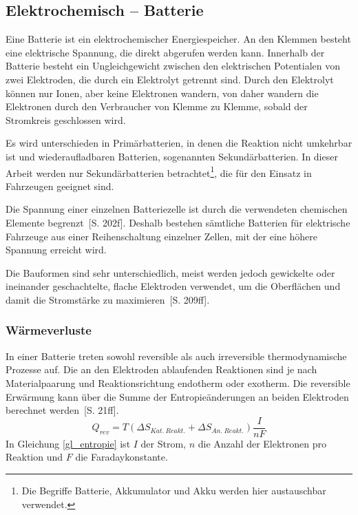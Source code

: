 \subsection{Elektrochemisch – Batterie} %
Eine Batterie ist ein elektrochemischer Energiespeicher. An den Klemmen besteht eine elektrische Spannung, die direkt abgerufen werden kann. Innerhalb der Batterie besteht ein Ungleichgewicht zwischen den elektrischen Potentialen von zwei Elektroden, die durch ein Elektrolyt getrennt sind. Durch den Elektrolyt können nur Ionen, aber keine Elektronen wandern, von daher wandern die Elektronen durch den Verbraucher von Klemme zu Klemme, sobald der Stromkreis geschlossen wird.

Es wird unterschieden in Primärbatterien, in denen die Reaktion nicht umkehrbar ist und wiederaufladbaren Batterien, sogenannten Sekundärbatterien. In dieser Arbeit werden nur Sekundärbatterien betrachtet\footnote{Die Begriffe Batterie, Akkumulator und Akku werden hier austauschbar verwendet.}, die für den Einsatz in Fahrzeugen geeignet sind.

Die Spannung einer einzelnen Batteriezelle ist durch die verwendeten chemischen Elemente begrenzt~\cite{Sterner:2014}[S. 202f]. Deshalb bestehen sämtliche Batterien für elektrische Fahrzeuge aus einer Reihenschaltung einzelner Zellen, mit der eine höhere Spannung erreicht wird.

Die Bauformen sind sehr unterschiedlich, meist werden jedoch gewickelte oder ineinander geschachtelte, flache Elektroden verwendet, um die Oberflächen und damit die Stromstärke zu maximieren~\cite{Sterner:2014}[S. 209ff].

\subsubsection{Wärmeverluste} \label{sec_waermeverluste}
In einer Batterie treten sowohl reversible als auch irreversible thermodynamische Prozesse auf. Die an den Elektroden ablaufenden Reaktionen sind je nach Materialpaarung und Reaktionsrichtung endotherm oder exotherm. Die reversible Erwärmung kann über die Summe der Entropieänderungen an beiden Elektroden berechnet werden~\cite{KiehneBattery}[S. 21ff].
\begin{equation}\label{gl_entropie}
	Q_{rev}=T(\Delta S_{Kat.~Reakt.} + \Delta S_{An.~Reakt.}) \frac{I}{nF}	
\end{equation}
In Gleichung \ref{gl_entropie} ist $I$ der Strom, $n$ die Anzahl der Elektronen pro Reaktion und $F$ die Faradaykonstante. 

